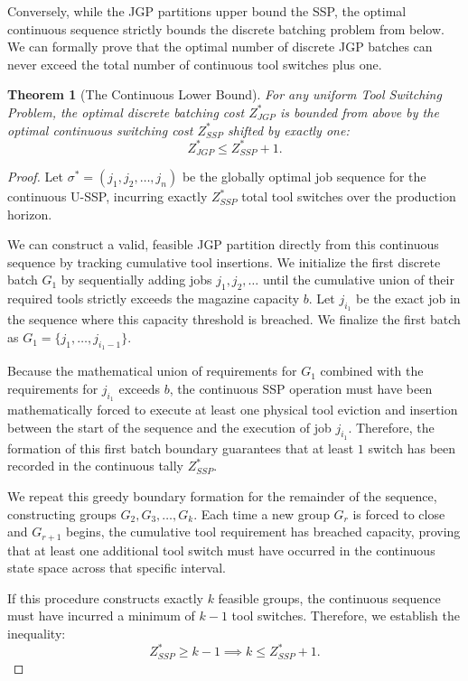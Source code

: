 \documentclass[11pt, a4paper]{book}
\newtheorem{theorem}{Theorem}[chapter]
\begin{document}
	Conversely, while the JGP partitions upper bound the SSP, the optimal continuous sequence strictly bounds the discrete batching problem from below. We can formally prove that the optimal number of discrete JGP batches can never exceed the total number of continuous tool switches plus one.
	
	\begin{theorem}[The Continuous Lower Bound]
		For any uniform Tool Switching Problem, the optimal discrete batching cost $Z_{JGP}^*$ is bounded from above by the optimal continuous switching cost $Z_{SSP}^*$ shifted by exactly one:
		\begin{equation}
			Z_{JGP}^* \le Z_{SSP}^* + 1.
		\end{equation}
	\end{theorem}
	
	\begin{proof}
		Let $\sigma^* = (j_1, j_2, \dots, j_n)$ be the globally optimal job sequence for the continuous U-SSP, incurring exactly $Z_{SSP}^*$ total tool switches over the production horizon. 
		
		We can construct a valid, feasible JGP partition directly from this continuous sequence by tracking cumulative tool insertions. We initialize the first discrete batch $G_1$ by sequentially adding jobs $j_1, j_2, \dots$ until the cumulative union of their required tools strictly exceeds the magazine capacity $b$. Let $j_{i_1}$ be the exact job in the sequence where this capacity threshold is breached. We finalize the first batch as $G_1 = \{j_1, \dots, j_{i_1-1}\}$.
		
		Because the mathematical union of requirements for $G_1$ combined with the requirements for $j_{i_1}$ exceeds $b$, the continuous SSP operation must have been mathematically forced to execute at least one physical tool eviction and insertion between the start of the sequence and the execution of job $j_{i_1}$. Therefore, the formation of this first batch boundary guarantees that at least $1$ switch has been recorded in the continuous tally $Z_{SSP}^*$.
		
		We repeat this greedy boundary formation for the remainder of the sequence, constructing groups $G_2, G_3, \dots, G_k$. Each time a new group $G_r$ is forced to close and $G_{r+1}$ begins, the cumulative tool requirement has breached capacity, proving that at least one additional tool switch must have occurred in the continuous state space across that specific interval.
		
		If this procedure constructs exactly $k$ feasible groups, the continuous sequence must have incurred a minimum of $k - 1$ tool switches. Therefore, we establish the inequality:
		\begin{equation}
			Z_{SSP}^* \ge k - 1 \implies k \le Z_{SSP}^* + 1.
		\end{equation}
		

\end{proof}
\end{document}
